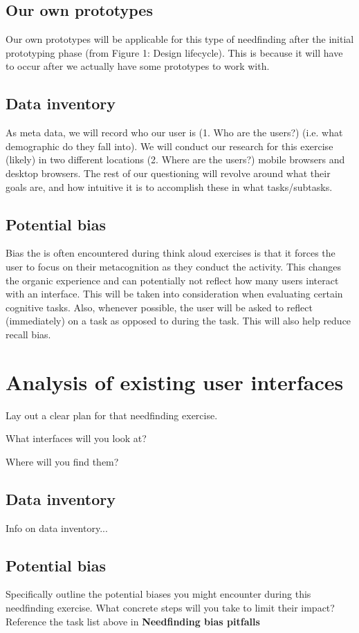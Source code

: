 \subsection{Our own prototypes}
Our own prototypes will be applicable for this type of needfinding after the initial prototyping phase (from Figure 1: Design lifecycle). This is because it will have to occur after we actually have some prototypes to work with.

\subsection{Data inventory}
As meta data, we will record who our user is (1. Who are the users?) (i.e. what demographic do they fall into). We will conduct our research for this exercise (likely) in two different locations (2. Where are the users?) mobile browsers and desktop browsers. The rest of our questioning will revolve around what their goals are, and how intuitive it is to accomplish these in what tasks/subtasks.

\subsection{Potential bias}
Bias the is often encountered during think aloud exercises is that it forces the user to focus on their metacognition as they conduct the activity. This changes the organic experience and can potentially not reflect how many users interact with an interface. This will be taken into consideration when evaluating certain cognitive tasks. Also, whenever possible, the user will be asked to reflect (immediately) on a task as opposed to during the task. This will also help reduce recall bias.

\section{Analysis of existing user interfaces}
Lay out a clear plan for that needfinding exercise.

What interfaces will you look at?

Where will you find them?

\subsection{Data inventory}
Info on data inventory...

\subsection{Potential bias}
Specifically outline the potential biases you might encounter during this needfinding exercise. What concrete steps will you take to limit their impact? Reference the task list above in \textbf{Needfinding bias pitfalls}

